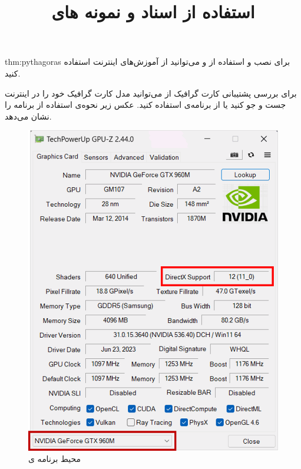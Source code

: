 \begin{theo}{thm:pythagoras}
    \Large
    برای نصب و استفاده از  و  می‌توانید از آموزش‌های اینترنت استفاده کنید.

    برای بررسی پشتیبانی کارت گرافیک از  می‌توانید مدل کارت گرافیک خود را در اینترنت جست و جو کنید یا از برنامه‌ی  استفاده کنید. عکس زیر نحوه‌ی استفاده از برنامه را نشان می‌دهد.

    \begin{figure}[H]
        \centering
        \setlength{\belowcaptionskip}{-10pt}
        \includegraphics[scale=0.50]{Images/3/3.Intro.0.1}
        \caption*{\Large محیط برنامه ی  \textbf{\vspace{12pt}}}
    \end{figure}
\end{theo}
\textbf{\vspace{25pt}}

\title{
    \LARGE
    \textbf{استفاده از اسناد  و نمونه های }
} \rullFillWithLine[0.5em]{1pt}
\textbf{\vspace{12pt}}

